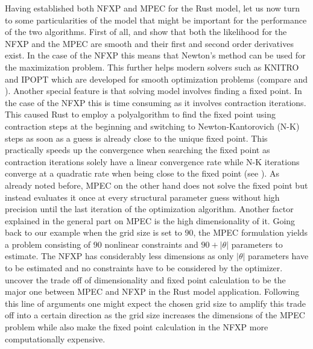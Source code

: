 Having established both NFXP and MPEC for the Rust model, let us now turn to some particularities of the model that might be important for the performance of the two algorithms. First of all, \cite{Rust.1987} and \cite{Su.Judd.2012} show that both the likelihood for the NFXP and the MPEC are smooth and their first and second order derivatives exist. In the case of the NFXP this means that Newton's method can be used for the maximization problem. This further helps modern solvers such as KNITRO and IPOPT which are developed for smooth optimization problems (compare \cite{Byrd.Nocedal.Waltz.2006} and \cite{Waechter2009}). Another special feature is that solving model involves finding a fixed point. In the case of the NFXP this is time consuming as it involves contraction iterations. This caused Rust to employ a polyalgorithm to find the fixed point using contraction steps at the beginning and switching to Newton-Kantorovich (N-K) steps as soon as a guess is already close to the unique fixed point. This practically speeds up the convergence when searching the fixed point as contraction iterations solely have a linear convergence rate while N-K iterations converge at a quadratic rate when being close to the fixed point (see \cite{Rust.1987, Rust.2000}). As already noted before, MPEC on the other hand does not solve the fixed point but instead evaluates it once at every structural parameter guess without high precision until the last iteration of the optimization algorithm. Another factor explained in the general part on MPEC is the high dimensionality of it. Going back to our example when the grid size is set to $90$, the MPEC formulation yields a problem consisting of $90$ nonlinear constraints and $90 + |\theta|$ parameters to estimate. The NFXP has considerably less dimensions as only $|\theta|$ parameters have to be estimated and no constraints have to be considered by the optimizer. \cite{Su.Judd.2012} uncover the trade off of dimensionality and fixed point calculation to be the major one between MPEC and NFXP in the Rust model application. Following this line of arguments one might expect the chosen grid size to amplify this trade off into a certain direction as the grid size increases the dimensions of the MPEC problem while also make the fixed point calculation in the NFXP more computationally expensive. 

